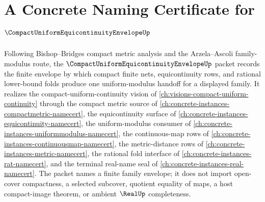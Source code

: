 \chapter{A Concrete Naming Certificate for $\CompactUniformEquicontinuityEnvelopeUp$}
\label{ch:concrete-instances-compact-uniform-equicontinuity-envelope-namecert}

Following Bishop--Bridges compact metric analysis and the Arzela--Ascoli family-modulus route, the $\CompactUniformEquicontinuityEnvelopeUp$ packet records the finite envelope by which compact finite nets, equicontinuity rows, and rational lower-bound folds produce one uniform-modulus handoff for a displayed family. It realizes the compact-uniform-continuity vision of \autoref{ch:visions-compact-uniform-continuity} through the compact metric source of \autoref{ch:concrete-instances-compactmetric-namecert}, the equicontinuity surface of \autoref{ch:concrete-instances-equicontinuity-namecert}, the uniform-modulus consumer of \autoref{ch:concrete-instances-uniformmodulus-namecert}, the continuous-map rows of \autoref{ch:concrete-instances-continuousmap-namecert}, the metric-distance rows of \autoref{ch:concrete-instances-metric-namecert}, the rational fold interface of \autoref{ch:concrete-instances-rat-namecert}, and the terminal real-name seal of \autoref{ch:concrete-instances-real-namecert}. The packet names a finite family envelope; it does not import open-cover compactness, a selected subcover, quotient equality of maps, a host compact-image theorem, or ambient $\RealUp$ completeness.

